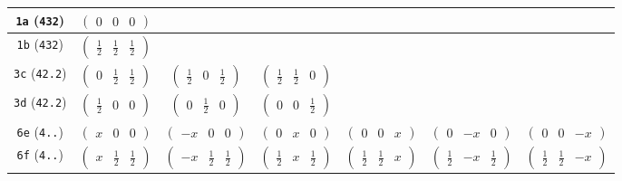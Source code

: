 \documentclass[fleqn,9pt,landscape]{jsarticle}
\begin{document}
\begin{center}
\begin{longtable}{ccccccc}
{\tt 1a} ({\tt 432}) & $ \begin{pmatrix} 0 & 0 & 0 \end{pmatrix} $ & $  $ & $  $ & $  $ & $  $ & $  $ \\ \hline
{\tt 1b} ({\tt 432}) & $ \begin{pmatrix} \frac{1}{2} & \frac{1}{2} & \frac{1}{2} \end{pmatrix} $ & $  $ & $  $ & $  $ & $  $ & $  $ \\ \hline
{\tt 3c} ({\tt 42.2}) & $ \begin{pmatrix} 0 & \frac{1}{2} & \frac{1}{2} \end{pmatrix} $ & $ \begin{pmatrix} \frac{1}{2} & 0 & \frac{1}{2} \end{pmatrix} $ & $ \begin{pmatrix} \frac{1}{2} & \frac{1}{2} & 0 \end{pmatrix} $ & $  $ & $  $ & $  $ \\ \hline
{\tt 3d} ({\tt 42.2}) & $ \begin{pmatrix} \frac{1}{2} & 0 & 0 \end{pmatrix} $ & $ \begin{pmatrix} 0 & \frac{1}{2} & 0 \end{pmatrix} $ & $ \begin{pmatrix} 0 & 0 & \frac{1}{2} \end{pmatrix} $ & $  $ & $  $ & $  $ \\ \hline
{\tt 6e} ({\tt 4..}) & $ \begin{pmatrix} x & 0 & 0 \end{pmatrix} $ & $ \begin{pmatrix} - x & 0 & 0 \end{pmatrix} $ & $ \begin{pmatrix} 0 & x & 0 \end{pmatrix} $ & $ \begin{pmatrix} 0 & 0 & x \end{pmatrix} $ & $ \begin{pmatrix} 0 & - x & 0 \end{pmatrix} $ & $ \begin{pmatrix} 0 & 0 & - x \end{pmatrix} $ \\ \hline
{\tt 6f} ({\tt 4..}) & $ \begin{pmatrix} x & \frac{1}{2} & \frac{1}{2} \end{pmatrix} $ & $ \begin{pmatrix} - x & \frac{1}{2} & \frac{1}{2} \end{pmatrix} $ & $ \begin{pmatrix} \frac{1}{2} & x & \frac{1}{2} \end{pmatrix} $ & $ \begin{pmatrix} \frac{1}{2} & \frac{1}{2} & x \end{pmatrix} $ & $ \begin{pmatrix} \frac{1}{2} & - x & \frac{1}{2} \end{pmatrix} $ & $ \begin{pmatrix} \frac{1}{2} & \frac{1}{2} & - x \end{pmatrix} $ \\ \hline

\end{longtable}
\end{center}
\end{document}
